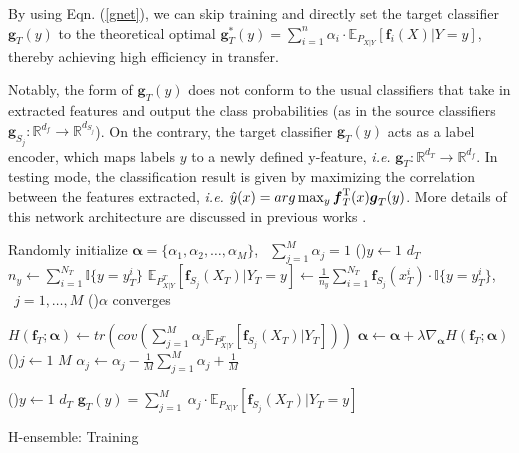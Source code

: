 \documentclass[letterpaper]{article} %
\begin{document}
By using Eqn. (\ref{gnet}), we can %
skip training and directly set the target classifier $\boldsymbol{g}_T(y)$ to the theoretical optimal $\boldsymbol{g}_T^*(y) = \sum_{i=1}^n\alpha_i \cdot \mathbb{E}_{P_{X|Y}}[\boldsymbol{f}_i(X)|Y=y]$, thereby achieving high efficiency in transfer. %

Notably, the form of $\boldsymbol{g}_T(y)$ does not conform to the usual classifiers that take in extracted features and output the class probabilities (as in the source classifiers $\boldsymbol{g}_{S_j}: \mathbb{R}^{d_f} \to \mathbb{R}^{d_{S_j}}$). On the contrary, the target classifier $\boldsymbol{g}_T(y)$ 
acts as a label encoder, %
which maps labels $y$ to a newly defined y-feature, \textit{i.e.} $\boldsymbol{g}_T: \mathbb{R}^{d_T} \to \mathbb{R}^{d_{f}}$. In testing mode, the classification result is given by maximizing the correlation between the features extracted, \textit{i.e.} $\hat{y}(x) = arg\max_y \boldsymbol{f}^{\rm T}_T(x) \boldsymbol{g}_T(y)$. More details of this network architecture are discussed in previous works \citep{huang2019universal}.


\begin{algorithm*}[!h]
    Randomly initialize $\boldsymbol{\alpha}=\{\alpha_1,\alpha_2,\dots,\alpha_M\}$, $\ \ \sum_{j=1}^M \alpha_j = 1$ \;
    \For(){$y \gets 1$ \KwTo $d_T$}{
          $n_y \gets \sum_{i = 1}^{N_T} \mathbb{I}\{y = y^i_T\}$ \;
          $\mathbb{E}_{P^T_{X|Y}} [\boldsymbol{f}_{S_j}(X_T)|Y_T = y] \gets \frac{1}{n_y} \sum_{i = 1}^{N_T} \boldsymbol{f}_{S_j}(x_T^i) \cdot \mathbb{I}\{y = y^i_T\}$, $\ \ j = 1,\dots,M$
          }
    \Repeat(){$\alpha$ converges}{
          
          $H(\boldsymbol{f}_T;\boldsymbol{\alpha}) \gets tr(cov(\sum_{j=1}^M \alpha_j \mathbb{E}_{P^T_{X|Y}}[\boldsymbol{f}_{S_j}(X_T)|Y_T]))$\;
          $\boldsymbol{\alpha} \gets \boldsymbol{\alpha} + \lambda \nabla_{\boldsymbol{\alpha}} H(\boldsymbol{f}_T; \boldsymbol{\alpha})$\;
          \For(){$j \gets 1$ \KwTo $M$}{
          $\alpha_j \gets \alpha_j - \frac{1}{M} \sum_{j=1}^M \alpha_j + \frac{1}{M}$
          }
        }
    \For(){$y \gets 1$ \KwTo $d_T$}{
          $\boldsymbol{g}_T(y) =   \sum_{j=1}^M\ \alpha_j \cdot \mathbb{E}_{P_{X|Y}}[\boldsymbol{f}_{S_j}(X_T)|Y_T=y] $
          }
\caption{H-ensemble: Training}
\label{htrain}
\end{algorithm*}
\end{document}
